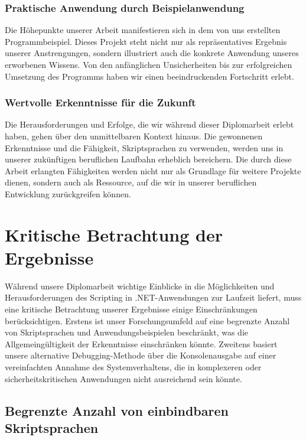 \subsubsection*{Praktische Anwendung durch Beispielanwendung}

Die Höhepunkte unserer Arbeit manifestieren sich in dem von uns erstellten Programmbeispiel. 
Dieses Projekt steht nicht nur als repräsentatives Ergebnis unserer Anstrengungen, sondern 
illustriert auch die konkrete Anwendung unseres erworbenen Wissens. Von den anfänglichen 
Unsicherheiten bis zur erfolgreichen Umsetzung des Programms haben wir einen beeindruckenden 
Fortschritt erlebt.

\subsubsection*{Wertvolle Erkenntnisse für die Zukunft}

Die Herausforderungen und Erfolge, die wir während dieser Diplomarbeit erlebt haben, gehen 
über den unmittelbaren Kontext hinaus. Die gewonnenen Erkenntnisse und die Fähigkeit, 
Skriptsprachen zu verwenden, werden uns in unserer zukünftigen beruflichen Laufbahn erheblich 
bereichern. Die durch diese Arbeit erlangten Fähigkeiten werden nicht nur als Grundlage für 
weitere Projekte dienen, sondern auch als Ressource, auf die wir in unserer beruflichen 
Entwicklung zurückgreifen können.

\newpage
\section{Kritische Betrachtung der Ergebnisse}

Während unsere Diplomarbeit wichtige Einblicke in die Möglichkeiten und Herausforderungen 
des Scripting in .NET-Anwendungen zur Laufzeit liefert, muss eine kritische Betrachtung 
unserer Ergebnisse einige Einschränkungen berücksichtigen. Erstens ist unser Forschungsumfeld 
auf eine begrenzte Anzahl von Skriptsprachen und Anwendungsbeispielen beschränkt, 
was die Allgemeingültigkeit der Erkenntnisse einschränken könnte. Zweitens basiert 
unsere alternative Debugging-Methode über die Konsolenausgabe auf einer vereinfachten 
Annahme des Systemverhaltens, die in komplexeren oder sicherheitskritischen Anwendungen 
nicht ausreichend sein könnte.

\subsection*{Begrenzte Anzahl von einbindbaren Skriptsprachen}

